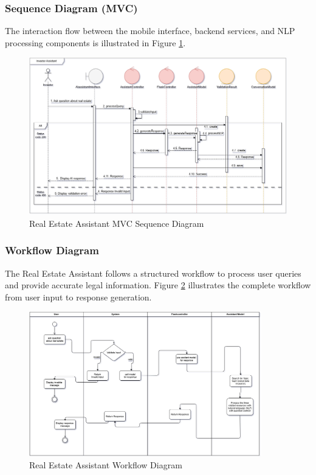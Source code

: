 \subsubsection{Sequence Diagram (MVC)}
The interaction flow between the mobile interface, backend services, and NLP processing components is illustrated in Figure \ref{fig:assistant-sequence-mvc}.
\newpage
\begin{figure}[htbp]
    \centering
    \includegraphics[width=1\textwidth]{images/assistant_sequence_mvc.png}
    \caption{Real Estate Assistant MVC Sequence Diagram}
    \label{fig:assistant-sequence-mvc}
\end{figure}

\subsubsection{Workflow Diagram}
The Real Estate Assistant follows a structured workflow to process user queries and provide accurate legal information. Figure \ref{fig:assistant-workflow} illustrates the complete workflow from user input to response generation.

\begin{figure}[htbp]
    \centering
    \includegraphics[width=0.9\textwidth]{images/assistant_workflow_diagram.png}
    \caption{Real Estate Assistant Workflow Diagram}
    \label{fig:assistant-workflow}
\end{figure}

